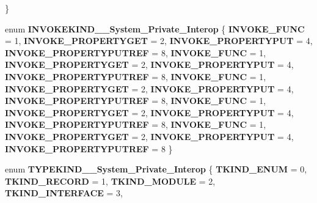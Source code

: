 \begin{DoxyCompactItemize}
 \}
\item 
\mbox{\label{namespace_system_1_1_runtime_1_1_interop_services_1_1_com_types_ab7f514e292cc5056c72acfec28a67bd4}} 
enum {\bfseries I\+N\+V\+O\+K\+E\+K\+I\+N\+D\+\_\+\+\_\+\+System\+\_\+\+Private\+\_\+\+Interop} \{ \newline
{\bfseries I\+N\+V\+O\+K\+E\+\_\+\+F\+U\+NC} = 1, 
{\bfseries I\+N\+V\+O\+K\+E\+\_\+\+P\+R\+O\+P\+E\+R\+T\+Y\+G\+ET} = 2, 
{\bfseries I\+N\+V\+O\+K\+E\+\_\+\+P\+R\+O\+P\+E\+R\+T\+Y\+P\+UT} = 4, 
{\bfseries I\+N\+V\+O\+K\+E\+\_\+\+P\+R\+O\+P\+E\+R\+T\+Y\+P\+U\+T\+R\+EF} = 8, 
\newline
{\bfseries I\+N\+V\+O\+K\+E\+\_\+\+F\+U\+NC} = 1, 
{\bfseries I\+N\+V\+O\+K\+E\+\_\+\+P\+R\+O\+P\+E\+R\+T\+Y\+G\+ET} = 2, 
{\bfseries I\+N\+V\+O\+K\+E\+\_\+\+P\+R\+O\+P\+E\+R\+T\+Y\+P\+UT} = 4, 
{\bfseries I\+N\+V\+O\+K\+E\+\_\+\+P\+R\+O\+P\+E\+R\+T\+Y\+P\+U\+T\+R\+EF} = 8, 
\newline
{\bfseries I\+N\+V\+O\+K\+E\+\_\+\+F\+U\+NC} = 1, 
{\bfseries I\+N\+V\+O\+K\+E\+\_\+\+P\+R\+O\+P\+E\+R\+T\+Y\+G\+ET} = 2, 
{\bfseries I\+N\+V\+O\+K\+E\+\_\+\+P\+R\+O\+P\+E\+R\+T\+Y\+P\+UT} = 4, 
{\bfseries I\+N\+V\+O\+K\+E\+\_\+\+P\+R\+O\+P\+E\+R\+T\+Y\+P\+U\+T\+R\+EF} = 8, 
\newline
{\bfseries I\+N\+V\+O\+K\+E\+\_\+\+F\+U\+NC} = 1, 
{\bfseries I\+N\+V\+O\+K\+E\+\_\+\+P\+R\+O\+P\+E\+R\+T\+Y\+G\+ET} = 2, 
{\bfseries I\+N\+V\+O\+K\+E\+\_\+\+P\+R\+O\+P\+E\+R\+T\+Y\+P\+UT} = 4, 
{\bfseries I\+N\+V\+O\+K\+E\+\_\+\+P\+R\+O\+P\+E\+R\+T\+Y\+P\+U\+T\+R\+EF} = 8, 
\newline
{\bfseries I\+N\+V\+O\+K\+E\+\_\+\+F\+U\+NC} = 1, 
{\bfseries I\+N\+V\+O\+K\+E\+\_\+\+P\+R\+O\+P\+E\+R\+T\+Y\+G\+ET} = 2, 
{\bfseries I\+N\+V\+O\+K\+E\+\_\+\+P\+R\+O\+P\+E\+R\+T\+Y\+P\+UT} = 4, 
{\bfseries I\+N\+V\+O\+K\+E\+\_\+\+P\+R\+O\+P\+E\+R\+T\+Y\+P\+U\+T\+R\+EF} = 8
 \}
\item 
\mbox{\label{namespace_system_1_1_runtime_1_1_interop_services_1_1_com_types_ad596501be9a8be229bde10d7bf051f8f}} 
enum {\bfseries T\+Y\+P\+E\+K\+I\+N\+D\+\_\+\+\_\+\+System\+\_\+\+Private\+\_\+\+Interop} \{ \newline
{\bfseries T\+K\+I\+N\+D\+\_\+\+E\+N\+UM} = 0, 
{\bfseries T\+K\+I\+N\+D\+\_\+\+R\+E\+C\+O\+RD} = 1, 
{\bfseries T\+K\+I\+N\+D\+\_\+\+M\+O\+D\+U\+LE} = 2, 
{\bfseries T\+K\+I\+N\+D\+\_\+\+I\+N\+T\+E\+R\+F\+A\+CE} = 3, 

\end{DoxyCompactItemize}

